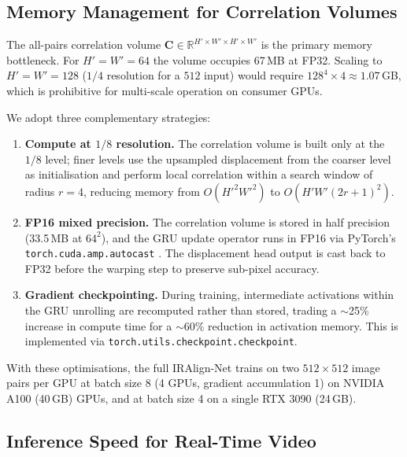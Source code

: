 \subsection{Memory Management for Correlation Volumes}
\label{subsec:memory}

The all-pairs correlation volume $\mathbf{C} \in \mathbb{R}^{H' \times
W' \times H' \times W'}$ is the primary memory bottleneck.  For
$H'{=}W'{=}64$ the volume occupies 67\,MB at FP32.  Scaling to
$H'{=}W'{=}128$ ($1/4$ resolution for a $512$ input) would require
$128^4 \times 4 \approx 1.07$\,GB, which is prohibitive for multi-scale
operation on consumer GPUs.

We adopt three complementary strategies:
\begin{enumerate}
  \item \textbf{Compute at $1/8$ resolution.}  The correlation volume is
        built only at the $1/8$ level; finer levels use the upsampled
        displacement from the coarser level as initialisation and perform
        local correlation within a search window of radius $r{=}4$,
        reducing memory from $O(H'^2 W'^2)$ to $O(H' W' (2r+1)^2)$.
  \item \textbf{FP16 mixed precision.}  The correlation volume is
        stored in half precision (33.5\,MB at $64^2$), and the GRU
        update operator runs in FP16 via PyTorch's
        \texttt{torch.cuda.amp.autocast} \cite{micikevicius2018mixed}.
        The displacement head output is cast back to FP32 before the
        warping step to preserve sub-pixel accuracy.
  \item \textbf{Gradient checkpointing.}  During training, intermediate
        activations within the GRU unrolling are recomputed rather than
        stored, trading a $\sim$25\% increase in compute time for a
        $\sim$60\% reduction in activation memory.  This is implemented
        via \texttt{torch.utils.checkpoint.checkpoint}.
\end{enumerate}

With these optimisations, the full IRAlign-Net trains on two $512 \times
512$ image pairs per GPU at batch size 8 (4 GPUs, gradient accumulation 1)
on NVIDIA A100 (40\,GB) GPUs, and at batch size 4 on a single RTX 3090
(24\,GB).

\subsection{Inference Speed for Real-Time Video}
\label{subsec:speed}

